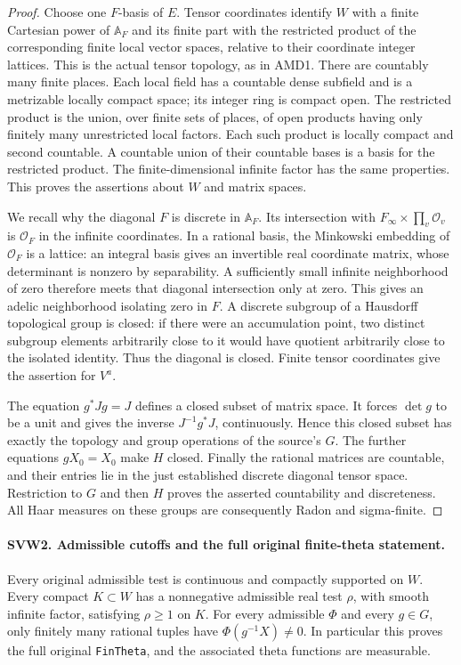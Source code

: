 \begin{proof}
Choose one $F$-basis of $E$.  Tensor coordinates identify $W$ with
a finite Cartesian power of $\mathbb A_F$ and its finite part with
the restricted product of the corresponding finite local vector
spaces, relative to their coordinate integer lattices.  This is the
actual tensor topology, as in AMD1.  There are countably many finite
places.  Each local field has a countable dense subfield and is a
metrizable locally compact space; its integer ring is compact open.
The restricted product is the union, over finite sets of places, of
open products having only finitely many unrestricted local factors.
Each such product is locally compact and second countable.  A
countable union of their countable bases is a basis for the restricted
product.  The finite-dimensional infinite factor has the same
properties.  This proves the assertions about $W$ and matrix spaces.

We recall why the diagonal $F$ is discrete in $\mathbb A_F$.  Its
intersection with $F_\infty\times\prod_v\mathcal O_v$ is
$\mathcal O_F$ in the infinite coordinates.  In a rational basis,
the Minkowski embedding of $\mathcal O_F$ is a lattice: an integral
basis gives an invertible real coordinate matrix, whose determinant
is nonzero by separability.  A sufficiently small infinite
neighborhood of zero therefore meets that diagonal intersection only
at zero.  This gives an adelic neighborhood isolating zero in $F$.
A discrete subgroup of a Hausdorff topological group is closed: if
there were an accumulation point, two distinct subgroup elements
arbitrarily close to it would have quotient arbitrarily close to
the isolated identity.  Thus the diagonal is closed.  Finite tensor
coordinates give the assertion for $V^a$.

The equation $g^*Jg=J$ defines a closed subset of matrix space.
It forces $\det g$ to be a unit and gives the inverse
$J^{-1}g^*J$, continuously.  Hence this closed subset has exactly
the topology and group operations of the source's $G$.  The further
equations $gX_0=X_0$ make $H$ closed.  Finally the rational matrices
are countable, and their entries lie in the just established
discrete diagonal tensor space.  Restriction to $G$ and then $H$
proves the asserted countability and discreteness.  All Haar
measures on these groups are consequently Radon and sigma-finite.
\end{proof}

\paragraph{SVW2. Admissible cutoffs and the full original finite-theta statement.}
\label{claim:SVW2}
Every original admissible test is continuous and compactly supported
on $W$.  Every compact $K\subset W$ has a nonnegative admissible
real test $\rho$, with smooth infinite factor, satisfying
$\rho\geq1$ on $K$.  For every admissible $\Phi$ and every $g\in G$,
only finitely many rational tuples have $\Phi(g^{-1}X)\ne0$.
In particular this proves the full original \texttt{FinTheta}, and
the associated theta functions are measurable.

